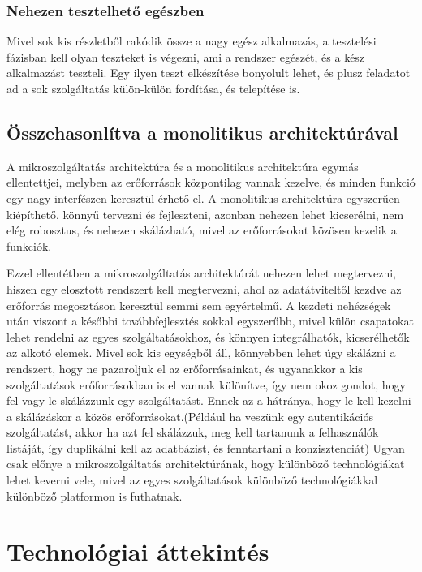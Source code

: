 \documentclass[11pt,magyar,a4paper,twoside,]{report}
\begin{document}
\subsubsection{Nehezen tesztelhető
egészben}\label{nehezen-tesztelhetux151-eguxe9szben}

Mivel sok kis részletből rakódik össze a nagy egész alkalmazás, a
tesztelési fázisban kell olyan teszteket is végezni, ami a rendszer
egészét, és a kész alkalmazást teszteli. Egy ilyen teszt elkészítése
bonyolult lehet, és plusz feladatot ad a sok szolgáltatás külön-külön
fordítása, és telepítése is.

\subsection{Összehasonlítva a monolitikus
architektúrával}\label{uxf6sszehasonluxedtva-a-monolitikus-architektuxfaruxe1val}

A mikroszolgáltatás architektúra és a monolitikus architektúra egymás
ellentettjei, melyben az erőforrások központilag vannak kezelve, és
minden funkció egy nagy interfészen keresztül érhető el. A monolitikus
architektúra egyszerűen kiépíthető, könnyű tervezni és fejleszteni,
azonban nehezen lehet kicserélni, nem elég robosztus, és nehezen
skálázható, mivel az erőforrásokat közösen kezelik a funkciók.

Ezzel ellentétben a mikroszolgáltatás architektúrát nehezen lehet
megtervezni, hiszen egy elosztott rendszert kell megtervezni, ahol az
adatátviteltől kezdve az erőforrás megosztáson keresztül semmi sem
egyértelmű. A kezdeti nehézségek után viszont a későbbi továbbfejlesztés
sokkal egyszerűbb, mivel külön csapatokat lehet rendelni az egyes
szolgáltatásokhoz, és könnyen integrálhatók, kicserélhetők az alkotó
elemek. Mivel sok kis egységből áll, könnyebben lehet úgy skálázni a
rendszert, hogy ne pazaroljuk el az erőforrásainkat, és ugyanakkor a kis
szolgáltatások erőforrásokban is el vannak különítve, így nem okoz
gondot, hogy fel vagy le skálázzunk egy szolgáltatást. Ennek az a
hátránya, hogy le kell kezelni a skálázáskor a közös
erőforrásokat.(Például ha veszünk egy autentikációs szolgáltatást, akkor
ha azt fel skálázzuk, meg kell tartanunk a felhasználók listáját, így
duplikálni kell az adatbázist, és fenntartani a konzisztenciát) Ugyan
csak előnye a mikroszolgáltatás architektúrának, hogy különböző
technológiákat lehet keverni vele, mivel az egyes szolgáltatások
különböző technológiákkal különböző platformon is futhatnak.

\section{Technológiai
áttekintés}\label{technoluxf3giai-uxe1ttekintuxe9s}
\end{document}
